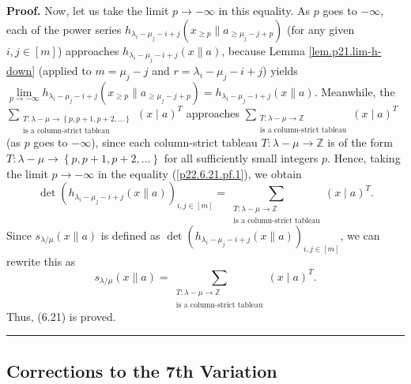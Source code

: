 \documentclass[numbers=enddot,12pt,final,onecolumn,notitlepage]{scrartcl}%
\theoremstyle{definition}
\newenvironment{proof}[1][Proof]{\noindent\textbf{#1.} }{\ \rule{0.5em}{0.5em}}
\let\sumnonlimits\sum
\renewcommand{\sum}{\sumnonlimits\limits}
\begin{document}
\begin{enumerate}
\begin{proof}
Now, let us take the limit $p\rightarrow-\infty$ in this equality. As $p$ goes
to $-\infty$, each of the power series $h_{\lambda_{i}-\mu_{j}-i+j}\left(
x_{\geq p}\parallel a_{\geq\mu_{j}-j+p}\right)  $ (for any given
$i,j\in\left[  m\right]  $) approaches $h_{\lambda_{i}-\mu_{j}-i+j}\left(
x\parallel a\right)  $, because Lemma \ref{lem.p21.lim-h-down} (applied to
$m=\mu_{j}-j$ and $r=\lambda_{i}-\mu_{j}-i+j$) yields $\lim
\limits_{p\rightarrow-\infty}h_{\lambda_{i}-\mu_{j}-i+j}\left(  x_{\geq
p}\parallel a_{\geq\mu_{j}-j+p}\right)  =h_{\lambda_{i}-\mu_{j}-i+j}\left(
x\parallel a\right)  $. Meanwhile, the $\sum_{\substack{T:\lambda
-\mu\rightarrow\left\{  p,p+1,p+2,\ldots\right\}  \\\text{is a column-strict
tableau}}}\left(  x\mid a\right)  ^{T}$ approaches $\sum_{\substack{T:\lambda
-\mu\rightarrow\mathbb{Z}\\\text{is a column-strict tableau}}}\left(  x\mid
a\right)  ^{T}$ (as $p$ goes to $-\infty$), since each column-strict tableau
$T:\lambda-\mu\rightarrow\mathbb{Z}$ is of the form $T:\lambda-\mu
\rightarrow\left\{  p,p+1,p+2,\ldots\right\}  $ for all sufficiently small
integers $p$. Hence, taking the limit $p\rightarrow-\infty$ in the equality
(\ref{p22.6.21.pf.1}), we obtain%
\[
\det\left(  h_{\lambda_{i}-\mu_{j}-i+j}\left(  x\parallel a\right)  \right)
_{i,j\in\left[  m\right]  }=\sum_{\substack{T:\lambda-\mu\rightarrow
\mathbb{Z}\\\text{is a column-strict tableau}}}\left(  x\mid a\right)  ^{T}.
\]
Since $s_{\lambda/\mu}\left(  x\parallel a\right)  $ is defined as
$\det\left(  h_{\lambda_{i}-\mu_{j}-i+j}\left(  x\parallel a\right)  \right)
_{i,j\in\left[  m\right]  }$, we can rewrite this as%
\[
s_{\lambda/\mu}\left(  x\parallel a\right)  =\sum_{\substack{T:\lambda
-\mu\rightarrow\mathbb{Z}\\\text{is a column-strict tableau}}}\left(  x\mid
a\right)  ^{T}.
\]
Thus, (6.21) is proved.
\end{proof}
\end{enumerate}

\subsection{Corrections to the 7th Variation}
\end{document}
